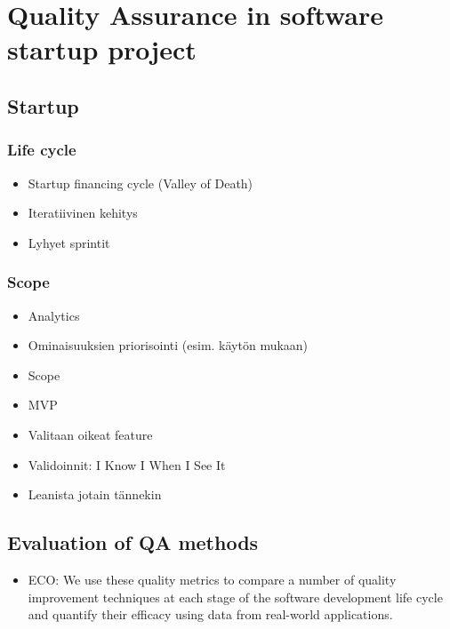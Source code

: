 
 \chapter{Quality Assurance in software startup project}

 \section{Startup}
 
 \subsection{Life cycle}

 \begin{itemize}

 \item Startup financing cycle (Valley of Death)
 \item Iteratiivinen kehitys
 \item Lyhyet sprintit
 
 \end{itemize}
 
 \subsection{Scope}
 
 \begin{itemize}
 
 \item Analytics
 \item Ominaisuuksien priorisointi (esim. käytön mukaan)
 \item Scope
 \item MVP
 \item Valitaan oikeat feature
 \item Validoinnit: I Know I When I See It
 \item Leanista jotain tännekin
 
 \end{itemize}
 
 \section{Evaluation of QA methods}
 
 \begin{itemize}
  
 \item ECO: We use these quality metrics to compare a number of quality improvement techniques at each stage of the software development life cycle and quantify their efficacy using data from real-world applications.
 
 \end{itemize}
 
